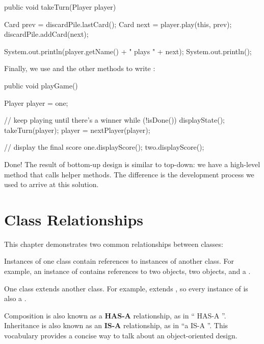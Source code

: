 \begin{code}
public void takeTurn(Player player) {
    Card prev = discardPile.lastCard();
    Card next = player.play(this, prev);
    discardPile.addCard(next);

    System.out.println(player.getName() + " plays " + next);
    System.out.println();
}
\end{code}

Finally, we use  and the other methods to write :

\begin{code}
public void playGame() {
    Player player = one;

    // keep playing until there's a winner
    while (!isDone()) {
        displayState();
        takeTurn(player);
        player = nextPlayer(player);
    }

    // display the final score
    one.displayScore();
    two.displayScore();
}
\end{code}

Done!
The result of bottom-up design is similar to top-down: we have a high-level method that calls helper methods.
The difference is the development process we used to arrive at this solution.


\section{Class Relationships}


This chapter demonstrates two common relationships between classes:

\begin{description}

Instances of one class contain references to instances of another class.
For example, an instance of  contains references to two  objects, two  objects, and a .

One class extends another class.
For example,  extends , so every instance of  is also a .

\end{description}


Composition is also known as a {\bf HAS-A} relationship, as in `` HAS-A ''.
Inheritance is also known as an {\bf IS-A} relationship, as in ``a  IS-A ''.
This vocabulary provides a concise way to talk about an object-oriented design.

